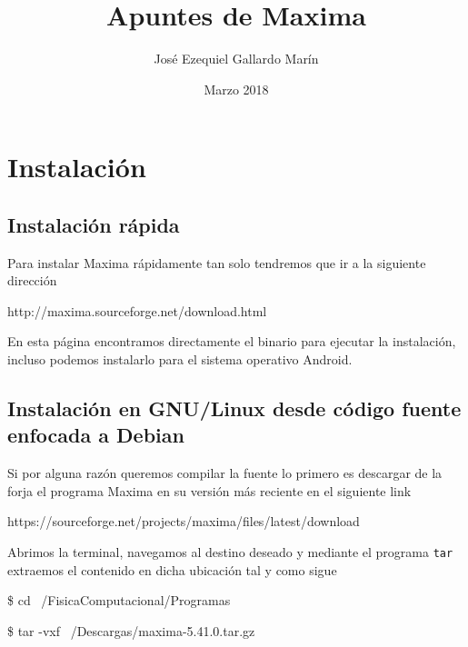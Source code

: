\documentclass[a4paper, 12pt] {article}
\begin{document}
\title{Apuntes de Maxima}
\author{Jos\'e Ezequiel Gallardo Mar\'in}
\date{Marzo 2018}
\maketitle

\section{Instalación}
\subsection{Instalación rápida}
Para instalar Maxima rápidamente tan solo tendremos que ir a la siguiente dirección
\begin{center}
http://maxima.sourceforge.net/download.html
\end{center}
En esta página encontramos directamente el binario para ejecutar la instalación, incluso podemos instalarlo para el sistema operativo Android.

\subsection{Instalación en GNU/Linux desde código fuente enfocada a Debian}
Si por alguna razón queremos compilar la fuente lo primero es descargar de la forja el programa Maxima en su versión más reciente en el siguiente link
\begin{center}
  https://sourceforge.net/projects/maxima/files/latest/download
\end{center}
Abrimos la terminal, navegamos al destino deseado y mediante el programa \texttt{tar} extraemos el contenido en dicha ubicación tal y como sigue
\begin{center}

  \$ cd ~/FisicaComputacional/Programas
  
  \$ tar -vxf ~/Descargas/maxima-5.41.0.tar.gz 

\end{center}
\end{document}
